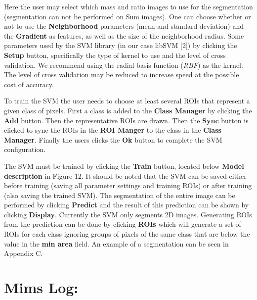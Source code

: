 \documentclass{article}
\begin{document}
	Here the user may select which mass and ratio images to use for the segmentation 
	(segmentation can not be performed on Sum images).  One can choose whether or not 
	to use the \textbf{Neighborhood} parameters (mean and standard deviation) and the 
	\textbf{Gradient} as features, as well as the size of the neighborhood radius. 
	Some parameters used by the SVM library (in our case libSVM [2]) by clicking the 
	\textbf{Setup} button, specifically the type of kernel to use and the level of 
	cross validation.  We recommend using the radial basis function (\textit{RBF}) 
	as the kernel.  The level of cross validation may be reduced to increase speed 
	at the possible cost of accuracy.

	To train the SVM the user needs to choose at least several ROIs that represent 
	a given class of pixels. First a class is added to the \textbf{Class Manager} 
	by clicking the \textbf{Add} button.  Then the representative ROIs are drawn.  
	Then the \textbf{Sync} button is clicked to sync the ROIs in the \textbf{ROI Manger} 
	to the class in the \textbf{Class Manager}. Finally the users clicks the \textbf{Ok} 
	button to complete the SVM configuration.


\newpage
	The SVM must be trained by clicking the \textbf{Train} button, located below 
	\textbf{Model description} in Figure 12.  It should be noted that the SVM can 
	be saved either before training (saving all parameter settings and training ROIs) 
	or after training (also saving the trained SVM).  The segmentation of the entire 
	image can be performed by clicking \textbf{Predict} and the result of this 
	prediction can be shown by clicking \textbf{Display}. Currently the SVM only 
	segments 2D images. Generating ROIs from the prediction can be done by clicking 
	\textbf{ROIs} which will generate a set of ROIs for each class ignoring groups 
	of pixels of the same class that are below the value in the \textbf{min area} 
	field. An example of a segmentation can be seen in Appendix C.

\newpage
\section*{Mims Log:}
	
\end{document}
